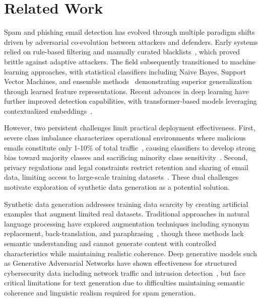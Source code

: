 \section{Related Work}
\label{sec:related}




Spam and phishing email detection has evolved through multiple paradigm shifts driven by adversarial co-evolution between attackers and defenders. Early systems relied on rule-based filtering and manually curated blacklists~\cite{al2023multi,magdy2022efficient}, which proved brittle against adaptive attackers. The field subsequently transitioned to machine learning approaches, with statistical classifiers including Naive Bayes, Support Vector Machines, and ensemble methods~\cite{kontsewaya2021evaluating,wijaya2023spam,budiman2024email,bazzaz2021hybrid,wang2025hybrid} demonstrating superior generalization through learned feature representations. Recent advances in deep learning have further improved detection capabilities, with transformer-based models leveraging contextualized embeddings~\cite{altwaijry2024advancing,thakur2023systematic}.

However, two persistent challenges limit practical deployment effectiveness. First, severe class imbalance characterizes operational environments where malicious emails constitute only 1-10\% of total traffic~\cite{bazzaz2021hybrid,johari2025key}, causing classifiers to develop strong bias toward majority classes and sacrificing minority class sensitivity~\cite{wang2025hybrid,gao2025comprehensivesurveyimbalanceddata}. Second, privacy regulations and legal constraints restrict retention and sharing of email data, limiting access to large-scale training datasets~\cite{li2024spamdam,kim2023pcsf}. These dual challenges motivate exploration of synthetic data generation as a potential solution.


Synthetic data generation addresses training data scarcity by creating artificial examples that augment limited real datasets. Traditional approaches in natural language processing have explored augmentation techniques including synonym replacement, back-translation, and paraphrasing~\cite{shorten2021text}, though these methods lack semantic understanding and cannot generate content with controlled characteristics while maintaining realistic coherence. Deep generative models such as Generative Adversarial Networks have shown effectiveness for structured cybersecurity data including network traffic and intrusion detection~\cite{bourou2021review,ammara2025syntheticnetworktrafficdata,10765501,agrawal2024review}, but face critical limitations for text generation due to difficulties maintaining semantic coherence and linguistic realism required for spam generation.


